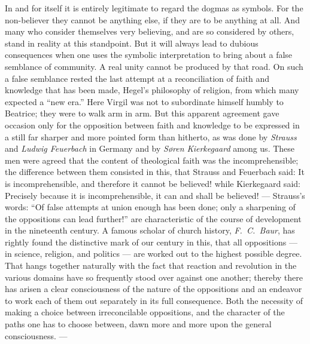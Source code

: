 \documentclass[12pt,a4paper,openany]{book}
\newcommand{\opage}[1]{\marginnote{\footnotesize\textit{[#1]}}}
\begin{document}
In and for itself it is entirely legitimate to regard the dogmas
\opage{207}as symbols.
For the non-believer they cannot be anything else, if they are to be anything
at all. And many who consider themselves very believing, and are so considered
by others, stand in reality at this standpoint. But it will always lead to
dubious consequences when one uses the symbolic interpretation to bring about
a false semblance of community. A real unity cannot be produced by that road.
On such a false semblance rested the last attempt at a reconciliation of faith
and knowledge that has been made, Hegel's philosophy of religion, from which
many expected a ``new era.'' Here Virgil was not to subordinate himself humbly
to Beatrice; they were to walk arm in arm. But this apparent agreement gave
occasion only for the opposition between faith and knowledge to be expressed
in a still far sharper and more pointed form than hitherto, as was done by
\emph{Strauss} and \emph{Ludwig Feuerbach} in Germany and by \emph{Søren
Kierkegaard} among us.
These men were agreed that the content of theological faith was the
incomprehensible; the difference between them consisted in this, that Strauss
and Feuerbach said: It is incomprehensible, and therefore it cannot be
believed! while Kierkegaard said: Precisely because it is incomprehensible, it
can and shall be believed! --- Strauss's words: ``Of false attempts at union
enough has been done; only a sharpening of the oppositions can lead further!''
are characteristic of the course of development in the nineteenth century. A
famous scholar of church history, \emph{F.~C.~Baur}, has rightly found the
distinctive mark of our century in this, that all oppositions --- in science,
religion, and politics --- are worked out to the highest possible degree. That
hangs together naturally with the fact that reaction and revolution in the
various domains have so frequently stood over against one another; thereby
there has arisen a clear consciousness of the nature of the oppositions and an
endeavor to work each of them out separately in its full consequence. Both the
necessity of making a choice between irreconcilable oppositions, and the
character of the paths one has to choose between, dawn more and more upon the
general consciousness. ---
\end{document}
